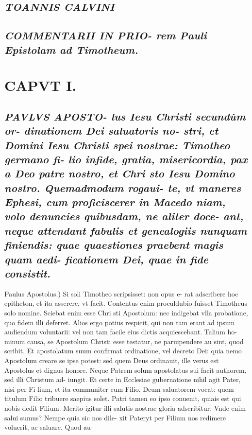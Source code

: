 \documentclass{article}
\begin{document}
\begin{pages}
\subsection*{\textit{TOANNIS CALVINI }}
{}
\subsection*{\textit{COMMENTARII IN PRIO- rem Pauli Epistolam ad Timotheum. }}
\endnumbering\beginnumbering\section{CAPVT I.}
{}
\subsection*{\textit{\huge\textbf{P}\normalsize AVLVS APOSTO- lus Iesu Christi secundùm or- dinationem Dei saluatoris no- stri, et Domini Iesu Christi spei nostrae: Timotheo germano fi- lio infide, gratia, misericordia, pax a Deo patre nostro, et Chri sto Iesu Domino nostro. Quemadmodum rogaui- te, vt maneres Ephesi, cum proficiscerer in Macedo niam, volo denuncies quibusdam, ne aliter doce- ant, neque attendant fabulis et genealogiis nunquam finiendis: quae quaestiones praebent magis quam aedi- ficationem Dei, quae in fide consistit. }}\pstart Paulus Apostolus.) Si soli Timotheo scripsisset: non opus e- rat adscribere hoc epitheton, et ita asserere, vt facit. Contentus enim proculdubio fuisset Timotheus solo nomine. Sciebat enim esse Chri sti Apostolum: nec indigebat vlla probatione, quo fidem illi deferret. Alios ergo potius respicit, qui non tam erant ad ipsum audiendum voluntarii: vel non tam facile eius dictis acquiescebant. Talium ho- minum causa, se Apostolum Christi esse testatur, ne paruipendere au sint, quod scribit. Et apostolatum suum confirmat ordinatione, vel decreto Dei: quia nemo Apostolum creare se ipse potest: sed quem Deus ordinauit, ille verus est Apostolus et dignus honore. Neque Patrem solum apostolatus sui facit authorem, sed illi Christum ad- iungit. Et certe in Ecclesiae gubernatione nihil agit Pater, nisi per Fi lium, et ita communiter cum Filio. Deum saluatorem vocat: quem titulum Filio tribuere saepius solet. Patri tamen eo ipso conuenit, quiais est qui nobis dedit Filium. Merito igitur illi salutis nostrae gloria adscribitur. Vnde enim salui sumus? Nempe quia sic nos dile- xit Pateryt per Filium nos redimere voluerit, ac saluare. Quod au-  \pend

\end{pages}
\end{document}
